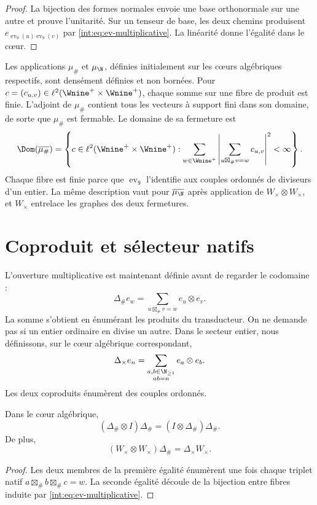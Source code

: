 \begin{proof}
La bijection des formes normales envoie une base orthonormale sur une autre et prouve
l'unitarité. Sur un tenseur de base, les deux chemins produisent
$e_{\operatorname{ev}_9(u)\operatorname{ev}_9(v)}$ par
\eqref{int:eq:ev-multiplicative}. La linéarité donne l'égalité dans le cœur.
\end{proof}

Les applications $\mu_\#$ et $\mu_{\N}$, définies initialement sur les cœurs
algébriques respectifs, sont densément définies et non bornées. Pour
\(c=(c_{u,v})\in\ell^2(\Wnine^+\times\Wnine^+)\), chaque somme sur une fibre de produit
est finie. L'adjoint de \(\mu_\#\) contient tous les vecteurs à support
fini dans son domaine, de sorte que \(\mu_\#\) est fermable. Le domaine de sa
fermeture est
\[
 \Dom(\overline{\mu_\#})=
 \left\{c\in\ell^2(\Wnine^+\times\Wnine^+):
 \sum_{w\in\Wnine^+}
 \left|\sum_{u\boxtimes_\#v=w}c_{u,v}\right|^2<\infty
 \right\}.
\]
Chaque fibre est finie parce que $\operatorname{ev}_9$ l'identifie aux couples
ordonnés de diviseurs d'un entier. La même description vaut pour
\(\overline{\mu_{\N}}\) après application de \(W_\times\otimes W_\times\), et
$W_\times$ entrelace les graphes des deux fermetures.

\section{Coproduit et sélecteur natifs}

L'ouverture multiplicative est maintenant définie avant de regarder le codomaine :
\[
 \Delta_\#e_w
 =\sum_{u\boxtimes_\#v=w}e_u\otimes e_v.
\]
La somme s'obtient en énumérant les produits du transducteur. On ne demande pas si
un entier ordinaire en divise un autre.
Dans le secteur entier, nous définissons, sur le cœur algébrique correspondant,
\[
 \Delta_\times e_n
 =\sum_{\substack{a,b\in\N_{\geq1}\\ab=n}}e_a\otimes e_b.
\]
Les deux coproduits énumèrent des couples ordonnés.

\begin{theorem}
Dans le cœur algébrique,
\[
 (\Delta_\#\otimes I)\Delta_\#
 =(I\otimes\Delta_\#)\Delta_\#.
\]
De plus,
\[
 (W_\times\otimes W_\times)\Delta_\#
 =\Delta_\times W_\times.
\]
\end{theorem}

\begin{proof}
Les deux membres de la première égalité énumèrent une fois chaque triplet natif
$a\boxtimes_\#b\boxtimes_\#c=w$. La seconde égalité découle de la bijection
entre fibres induite par \eqref{int:eq:ev-multiplicative}.
\end{proof}

